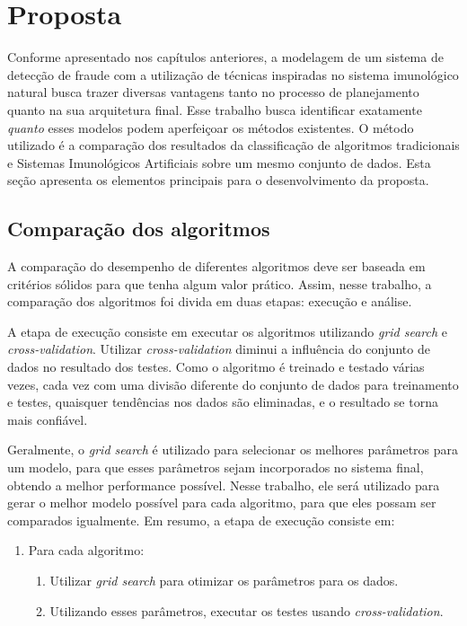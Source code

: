\chapter{Proposta}

Conforme apresentado nos capítulos anteriores, a modelagem de um sistema de detecção de fraude com a utilização de técnicas inspiradas no sistema imunológico natural busca trazer diversas vantagens tanto no processo de planejamento quanto na sua arquitetura final. Esse trabalho busca identificar exatamente \emph{quanto} esses modelos podem aperfeiçoar os métodos existentes. O método utilizado é a comparação dos resultados da classificação de algoritmos tradicionais e Sistemas Imunológicos Artificiais sobre um mesmo conjunto de dados. Esta seção apresenta os elementos principais para o desenvolvimento da proposta.

\section{Comparação dos algoritmos}

A comparação do desempenho de diferentes algoritmos deve ser baseada em critérios sólidos para que tenha algum valor prático. Assim, nesse trabalho, a comparação dos algoritmos foi divida em duas etapas: execução e análise.

A etapa de execução consiste em executar os algoritmos utilizando \emph{grid search} e \emph{cross-validation}. Utilizar \emph{cross-validation} diminui a influência do conjunto de dados no resultado dos testes. Como o algoritmo é treinado e testado várias vezes, cada vez com uma divisão diferente do conjunto de dados para treinamento e testes, quaisquer tendências nos dados são eliminadas, e o resultado se torna mais confiável.

Geralmente, o \emph{grid search} é utilizado para selecionar os melhores parâmetros para um modelo, para que esses parâmetros sejam incorporados no sistema final, obtendo a melhor performance possível. Nesse trabalho, ele será utilizado para gerar o melhor modelo possível para cada algoritmo, para que eles possam ser comparados igualmente. Em resumo, a etapa de execução consiste em:

\begin{enumerate}
    \item Para cada algoritmo:
        \begin{enumerate}
            \item Utilizar \emph{grid search} para otimizar os parâmetros para os dados.
            \item Utilizando esses parâmetros, executar os testes usando \emph{cross-validation}.
        \end{enumerate}
\end{enumerate}

